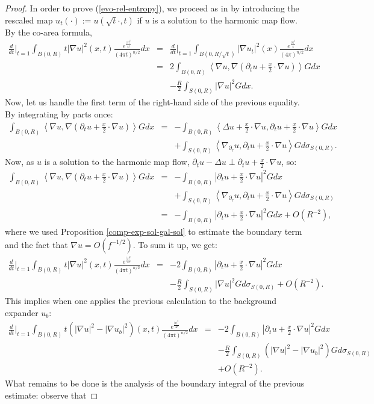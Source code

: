 \documentclass[a4paper,11pt,reqno]{amsart}
\begin{document}
\begin{proof}
In order to prove (\ref{evo-rel-entropy}), we proceed as in \cite{Str-Har-Map} by introducing the rescaled map $u_t(\cdot):=u(\sqrt{t}\cdot,t)$ if $u$ is a solution to the harmonic map flow. 
By the co-area formula, 
\begin{eqnarray*}
\frac{d}{dt}\bigg\rvert_{t=1}\int_{B(0,R)}t|\nabla u|^2(x,t)\frac{e^{\frac{|x|^2}{4t}}}{(4\pi t)^{n/2}}dx&=&\frac{d}{dt}\bigg\rvert_{t=1}\int_{B(0,R/\sqrt{t})}|\nabla u_t|^2(x)\frac{e^{\frac{|x|^2}{4}}}{(4\pi)^{n/2}}dx\\
&=&2\int_{B(0,R)}\left<\nabla u,\nabla\left(\partial_tu+\frac{x}{2}\cdot\nabla u\right)\right>Gdx\\
&&-\frac{R}{2}\int_{S(0,R)}|\nabla u|^2Gdx.
\end{eqnarray*}
Now, let us handle the first term of the right-hand side of the previous equality. By integrating by parts once:
\begin{eqnarray*}
\int_{B(0,R)}\left<\nabla u,\nabla\left(\partial_tu+\frac{x}{2}\cdot\nabla u\right)\right>Gdx&=&-\int_{B(0,R)}\left<\Delta u+\frac{x}{2}\cdot\nabla u,\partial_tu+\frac{x}{2}\cdot\nabla u\right>Gdx\\
&&+\int_{S(0,R)}\left<\nabla_{\partial_r}u,\partial_tu+\frac{x}{2}\cdot\nabla u\right>Gd\sigma_{S(0,R)}.
\end{eqnarray*}
Now, as $u$ is a solution to the harmonic map flow, $\partial_tu-\Delta u\perp \partial_t u+\frac{x}{2}\cdot\nabla u$, so:
\begin{eqnarray*}
\int_{B(0,R)}\left<\nabla u,\nabla\left(\partial_tu+\frac{x}{2}\cdot\nabla u\right)\right>Gdx&=&-\int_{B(0,R)}\left|\partial_tu+\frac{x}{2}\cdot\nabla u\right|^2Gdx\\
&&+\int_{S(0,R)}\left<\nabla_{\partial_r}u,\partial_tu+\frac{x}{2}\cdot\nabla u\right>Gd\sigma_{S(0,R)}\\
&=&-\int_{B(0,R)}\left|\partial_tu+\frac{x}{2}\cdot\nabla u\right|^2Gdx+\textit{O}\left(R^{-2}\right),
\end{eqnarray*}
where we used Proposition \ref{comp-exp-sol-gal-sol} to estimate the boundary term and the fact that $\nabla u=\textit{O}(f^{-1/2})$. To sum it up, we get:
\begin{eqnarray*}
\frac{d}{dt}\bigg\rvert_{t=1}\int_{B(0,R)}t|\nabla u|^2(x,t)\frac{e^{\frac{|x|^2}{4t}}}{(4\pi t)^{n/2}}dx&=&
-2\int_{B(0,R)}\left|\partial_tu+\frac{x}{2}\cdot\nabla u\right|^2Gdx\\
&&-\frac{R}{2}\int_{S(0,R)}|\nabla u|^2Gd\sigma_{S(0,R)}+\textit{O}\left(R^{-2}\right).
\end{eqnarray*}
This implies when one applies the previous calculation to the background expander $u_b$:
\begin{eqnarray*}
\frac{d}{dt}\bigg\rvert_{t=1}\int_{B(0,R)}t(|\nabla u|^2-|\nabla u_b|^2)(x,t)\frac{e^{\frac{|x|^2}{4t}}}{(4\pi t)^{n/2}}dx&=&
-2\int_{B(0,R)}\left|\partial_tu+\frac{x}{2}\cdot\nabla u\right|^2Gdx\\
&&-\frac{R}{2}\int_{S(0,R)}(|\nabla u|^2-|\nabla u_b|^2)Gd\sigma_{S(0,R)}\\
&&+\textit{O}\left(R^{-2}\right).
\end{eqnarray*}
What remains to be done is the analysis of the boundary integral of the previous estimate: observe that


\end{proof}
\end{document}
